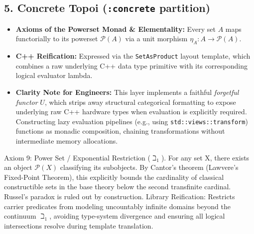 \subsection{5. Concrete Topoi (\texttt{:concrete} partition)}
\begin{itemize}
    \item \textbf{Axioms of the Powerset Monad \& Elementality:} Every set $A$ maps functorially to its powerset $\mathcal{P}(A)$ via a unit morphism $\eta_A: A \to \mathcal{P}(A)$.
    \item \textbf{C++ Reification:} Expressed via the \texttt{SetAsProduct} layout template, which combines a raw underlying C++ data type primitive with its corresponding logical evaluator lambda.
    \item \textbf{Clarity Note for Engineers:} This layer implements a faithful \textit{forgetful functor} $U$, which strips away structural categorical formatting to expose underlying raw C++ hardware types when evaluation is explicitly required. Constructing lazy evaluation pipelines (e.g., using \texttt{std::views::transform}) functions as monadic composition, chaining transformations without intermediate memory allocations.
\end{itemize}
Axiom 9: Power Set / Exponential Restriction (\(\beth _{1}\)). For any set X, there exists an object \(\mathcal{P}(X)\) classifying its subobjects. By Cantor’s theorem (Lawvere’s Fixed-Point Theorem), this explicitly bounds the cardinality of classical constructible sets in the base theory below the second transfinite cardinal. Russel's paradox is ruled out by construction. Library Reification: Restricts carrier predicates from modeling uncountably infinite domains beyond the continuum \(\beth _{1}\), avoiding type-system divergence and ensuring all logical intersections resolve during template translation.

